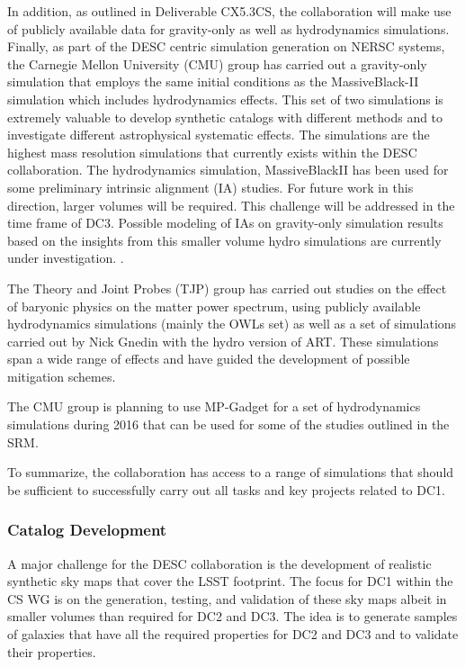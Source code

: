 In addition, as outlined in Deliverable CX5.3CS, the collaboration will make use of publicly available data for gravity-only as well as hydrodynamics simulations. Finally, as part of the DESC centric simulation generation on NERSC systems, the Carnegie Mellon University (CMU) group has carried out a gravity-only simulation that employs the same initial conditions as the MassiveBlack-II simulation which includes hydrodynamics effects. This set of two simulations is extremely valuable to develop synthetic catalogs with different methods and to investigate different astrophysical systematic effects. The simulations are the highest mass resolution simulations that currently exists within the DESC collaboration. The hydrodynamics simulation, MassiveBlackII has been used for some preliminary intrinsic alignment (IA) studies. For future work in this direction, larger volumes will be required. This challenge will be addressed in the time frame of DC3. Possible modeling of IAs on gravity-only simulation results based on the insights from this smaller volume hydro simulations are currently under investigation. .

The Theory and Joint Probes (TJP) group has carried out studies on the effect of baryonic physics on the matter power spectrum, using publicly available hydrodynamics simulations (mainly the OWLs set) as well as a set of simulations carried out by Nick Gnedin with the hydro version of ART. These simulations span a wide range of effects and have guided the development of possible mitigation schemes.

The CMU group is planning to use MP-Gadget for a set of hydrodynamics simulations during 2016 that can be used for some of the studies outlined in the SRM.

To summarize, the collaboration has access to a range of simulations that should be sufficient to successfully carry out all tasks and key projects related to DC1. 

\subsubsection{Catalog Development}
\label{sec:keysims:dc1:dev}

A major challenge for the DESC collaboration is the development of realistic synthetic sky maps that cover the LSST footprint. The focus for DC1 within the CS WG is on the generation, testing, and validation of these sky maps albeit in smaller volumes than required for DC2 and DC3. The idea is to generate samples of galaxies that have all the required properties for DC2 and DC3 and to validate their properties. 


